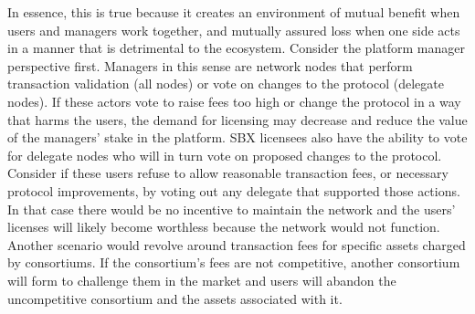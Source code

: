 \documentclass[12pt]{article}
\begin{document}
In essence, this is true because it creates an environment of mutual benefit when users and managers work together, and mutually assured loss when one side acts in a manner that is detrimental to the ecosystem. Consider the platform manager perspective first. Managers in this sense are network nodes that perform transaction validation (all nodes) or vote on changes to the protocol (delegate nodes). If these actors vote to raise fees too high or change the protocol in a way that harms the users, the demand for licensing may decrease and reduce the value of the managers’ stake in the platform. SBX licensees also have the ability to vote for delegate nodes who will in turn vote on proposed changes to the protocol. Consider if these users refuse to allow reasonable transaction fees, or necessary protocol improvements, by voting out any delegate that supported those actions. In that case there would be no incentive to maintain the network and the users’ licenses will likely become worthless because the network would not function. Another scenario would revolve around transaction fees for specific assets charged by consortiums. If the consortium’s fees are not competitive, another consortium will form to challenge them in the market and users will abandon the uncompetitive consortium and the assets associated with it.


					
\end{document}
